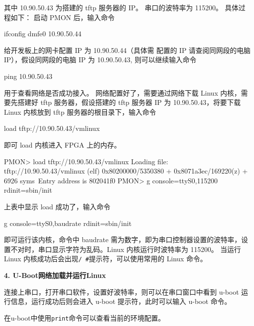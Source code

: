 其中 10.90.50.43 为搭建的 tftp 服务器的 IP。
串口的波特率为 115200。
具体过程如下：
启动 PMON 后，输入命令

\begin{CodeBlock}[language=BookShell]
ifconfig dmfe0 10.90.50.44
\end{CodeBlock}

给开发板上的网卡配置 IP 为 10.90.50.44（具体需 配置的 IP 请查阅同网段的电脑 IP），假设同网段的电脑 IP 为 10.90.50.43, 则可以继续输入命令

\begin{CodeBlock}[language=BookShell]
ping 10.90.50.43
\end{CodeBlock}

用于查看网络是否成功接入。
网络配置好了，需要通过网络下载 Linux 内核，需要先搭建好 tftp 服务器，假设搭建的 tftp 服务器 IP 为 10.90.50.43，将要下载 Linux 内核放到 tftp 服务器的根目录下，输入命令

\begin{CodeBlock}[language=BookShell]
load tftp://10.90.50.43/vmlinux
\end{CodeBlock}

即可 load 内核进入 FPGA 上的内存。

\begin{CodeBlock}[language=BookText]
PMON> load tftp://10.90.50.43/vmlinux
Loading file: tftp://10.90.50.43/vmlinux (elf)
0x80200000/5350380 + 0x8071a3ec/169220(z) + 6926 syms\
Entry address is 802041f0
PMON> g console=ttyS0,115200 rdinit=sbin/init
\end{CodeBlock}

上表中显示 load 成功了，输入命令

\begin{CodeBlock}[language=BookShell]
g console=ttyS0,baudrate rdinit=sbin/init
\end{CodeBlock}

即可运行该内核，命令中 baudrate 需为数字，即为串口控制器设置的波特率，设置不对时，串口显示字符为乱码。Linux 内核运行时波特率为 115200。
当运行 Linux 内核成功后会出现\texttt{/\ \#}提示符，可以使用常用的 Linux 命令。

\textbf{4. U-Boot网络加载并运行Linux}

连接上串口，打开串口软件，设置好波特率，则可以在串口窗口中看到 u-boot 运行信息，运行成功后则会进入 u-boot 提示符，此时可以输入 u-boot 命令。

在u-boot中使用\texttt{print}命令可以查看当前的环境配置。

